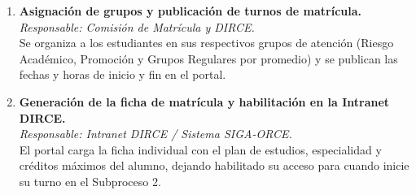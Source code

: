 \begin{enumerate}
    \item \textbf{Asignación de grupos y publicación de turnos de matrícula.} \\
    \textit{Responsable: Comisión de Matrícula y DIRCE.} \\
    Se organiza a los estudiantes en sus respectivos grupos de atención (Riesgo Académico, Promoción y Grupos Regulares por promedio) y se publican las fechas y horas de inicio y fin en el portal.

    \item \textbf{Generación de la ficha de matrícula y habilitación en la Intranet DIRCE.} \\
    \textit{Responsable: Intranet DIRCE / Sistema SIGA-ORCE.} \\
    El portal carga la ficha individual con el plan de estudios, especialidad y créditos máximos del alumno, dejando habilitado su acceso para cuando inicie su turno en el Subproceso 2.
\end{enumerate}
